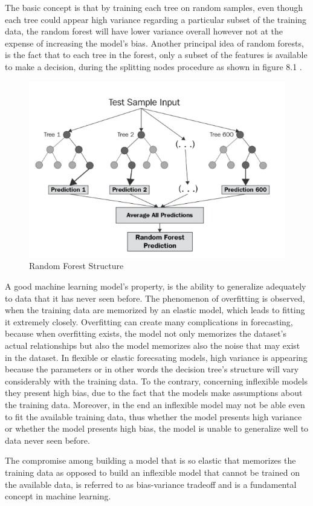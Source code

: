 The basic concept is that by training each tree on random samples, even though each tree could appear high variance regarding a particular subset of the training data, the random forest will have lower variance overall however not at the expense of increasing the model's bias. Another principal idea of random forests, is the fact that to each tree in the forest, only a subset of the features is available to make a decision, during the splitting nodes procedure as shown in figure 8.1 \cite{rfr}.
\begin{figure}[htbp]
\centering
\includegraphics[width=0.7\linewidth]{project/rf.png}

\caption{Random Forest Structure}
\end{figure}
\par A good machine learning model's property, is the ability to generalize adequately to data that it has never seen before.
The phenomenon of overfitting is observed, when the training data are memorized by an elastic model, which leads to fitting it extremely closely.  Overfitting can create many complications in forecasting, because when overfitting exists, the model not only memorizes the dataset's actual relationships but also the model memorizes also the noise that may exist in the dataset. In flexible or elastic forecsating models, high variance is appearing because the parameters or in other words the decision tree's structure  will vary considerably with the training data. To the contrary, concerning inflexible models they present high bias, due to the fact that the models make assumptions about the training data. Moreover, in the end an inflexible model may not be able even to fit the available training data, thus whether the model presents high variance or whether the model presents high bias, the model is unable to generalize well to data never seen before.
\par 
The compromise among building a model that is so elastic that memorizes the training data as opposed to build an inflexible model that cannot be trained on the available data, is referred to as bias-variance tradeoff and is a fundamental concept in machine learning.
